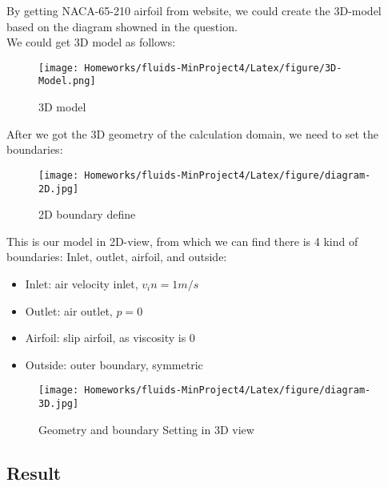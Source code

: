 \documentclass[12pt]{article}
\begin{document}
By getting NACA-65-210 airfoil from website, we could create the 3D-model based on the diagram showned in the question.\\

We could get 3D model as follows:
\begin{figure}[H]
    \centering
    \texttt{[image: Homeworks/fluids-MinProject4/Latex/figure/3D-Model.png]}
    \label{IGs.jpg}
    \caption{3D model}
\end{figure}






After we got the 3D geometry of the calculation domain, we need to set the boundaries:

\begin{figure}[H]
    \centering
    \texttt{[image: Homeworks/fluids-MinProject4/Latex/figure/diagram-2D.jpg]}
    \label{IGs.jpg}
    \caption{2D boundary define}
\end{figure}

This is our model in 2D-view, from which we can find there is 4 kind of boundaries: Inlet, outlet, airfoil, and outside:
\begin{itemize}
    \item Inlet: air velocity inlet, $v_in = 1m/s$
    \item Outlet: air outlet, $p=0$
    \item Airfoil: slip airfoil, as viscosity is 0
    \item Outside: outer boundary, symmetric
\end{itemize}


\begin{figure}[H]
    \centering
    \texttt{[image: Homeworks/fluids-MinProject4/Latex/figure/diagram-3D.jpg]}
    \label{IGs.jpg}
    \caption{Geometry and boundary Setting in 3D view}
\end{figure}













\subsection{Result}
\end{document}
